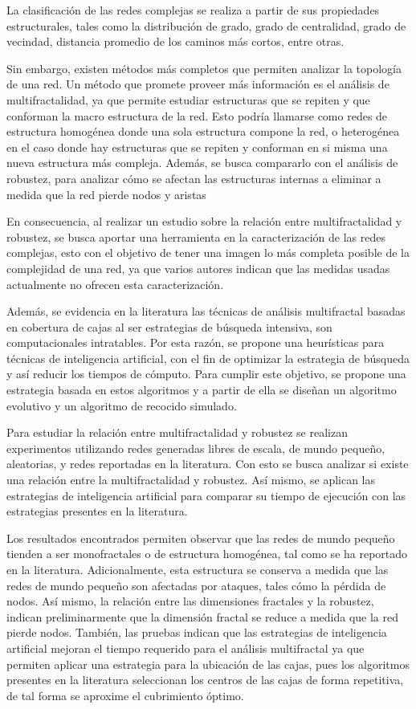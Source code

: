 La clasificación de las redes complejas se realiza a partir de sus propiedades estructurales, tales como la distribución de grado, grado de centralidad, grado de vecindad, distancia promedio de los caminos más cortos, entre otras. 

Sin embargo, existen métodos más completos que permiten analizar la topología de una red. Un método que promete proveer más información es el análisis de multifractalidad, ya que permite estudiar estructuras que se repiten y que conforman la macro estructura de la red. Esto podría llamarse como redes de estructura homogénea donde una sola estructura compone la red, o heterogénea en el caso donde hay estructuras que se repiten y conforman en si misma una nueva estructura más compleja. Además, se busca compararlo con el análisis de robustez, para analizar cómo se afectan las estructuras internas a eliminar a medida que la red pierde nodos y aristas 

En consecuencia, al realizar un estudio sobre la relación entre multifractalidad y robustez, se busca aportar una herramienta en la caracterización de las redes complejas, esto con el objetivo de tener una imagen lo más completa posible de la complejidad de una red, ya que varios autores indican que las medidas usadas actualmente no ofrecen esta caracterización.

Además, se evidencia en la literatura las técnicas de análisis multifractal basadas en cobertura de cajas al ser estrategias de búsqueda intensiva, son computacionales intratables. Por esta razón, se propone una heurísticas para técnicas de inteligencia artificial, con el fin de optimizar la estrategia de búsqueda y así reducir los tiempos de cómputo. Para cumplir este objetivo, se propone una estrategia basada en estos algoritmos y a partir de ella se diseñan un algoritmo evolutivo y un algoritmo de recocido simulado.

Para estudiar la relación entre multifractalidad y robustez se realizan experimentos utilizando redes generadas libres de escala, de mundo pequeño, aleatorias, y redes reportadas en la literatura. Con esto se busca analizar si existe una relación entre la multifractalidad y robustez. Así mismo, se aplican las estrategias de inteligencia artificial para comparar su tiempo de ejecución con las estrategias presentes en la literatura.

Los resultados encontrados permiten observar que las redes de mundo pequeño tienden a ser monofractales o de estructura homogénea, tal como se ha reportado en la literatura. Adicionalmente, esta estructura se conserva a medida que las redes de mundo pequeño son afectadas por ataques, tales cómo la pérdida de nodos. Así mismo, la relación entre las dimensiones fractales y la robustez, indican preliminarmente que la dimensión fractal se reduce a medida que la red pierde nodos. También, las pruebas indican que las estrategias de inteligencia artificial mejoran el tiempo requerido para el análisis multifractal ya que permiten aplicar una estrategia para la ubicación de las cajas, pues los algoritmos presentes en la literatura seleccionan los centros de las cajas de forma repetitiva, de tal forma se aproxime el cubrimiento óptimo.


